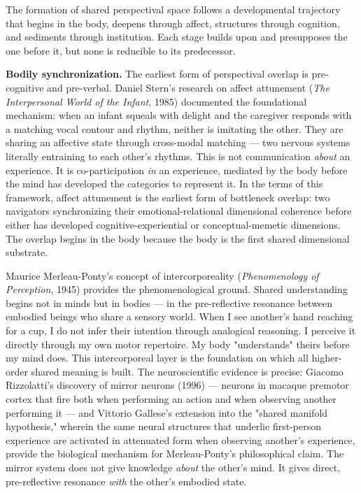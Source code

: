 The formation of shared perspectival space follows a developmental trajectory that begins in the body, deepens through affect, structures through cognition, and sediments through institution. Each stage builds upon and presupposes the one before it, but none is reducible to its predecessor.


\textbf{Bodily synchronization.} The earliest form of perspectival overlap is pre-cognitive and pre-verbal. Daniel Stern's research on affect attunement (\textit{The Interpersonal World of the Infant}, 1985) documented the foundational mechanism: when an infant squeals with delight and the caregiver responds with a matching vocal contour and rhythm, neither is imitating the other. They are sharing an affective state through cross-modal matching — two nervous systems literally entraining to each other's rhythms. This is not communication \textit{about} an experience. It is co-participation \textit{in} an experience, mediated by the body before the mind has developed the categories to represent it. In the terms of this framework, affect attunement is the earliest form of bottleneck overlap: two navigators synchronizing their emotional-relational dimensional coherence before either has developed cognitive-experiential or conceptual-memetic dimensions. The overlap begins in the body because the body is the first shared dimensional substrate.


Maurice Merleau-Ponty's concept of intercorporeality (\textit{Phenomenology of Perception}, 1945) provides the phenomenological ground. Shared understanding begins not in minds but in bodies — in the pre-reflective resonance between embodied beings who share a sensory world. When I see another's hand reaching for a cup, I do not infer their intention through analogical reasoning. I perceive it directly through my own motor repertoire. My body "understands" theirs before my mind does. This intercorporeal layer is the foundation on which all higher-order shared meaning is built. The neuroscientific evidence is precise: Giacomo Rizzolatti's discovery of mirror neurons (1996) — neurons in macaque premotor cortex that fire both when performing an action and when observing another performing it — and Vittorio Gallese's extension into the "shared manifold hypothesis," wherein the same neural structures that underlie first-person experience are activated in attenuated form when observing another's experience, provide the biological mechanism for Merleau-Ponty's philosophical claim. The mirror system does not give knowledge \textit{about} the other's mind. It gives direct, pre-reflective resonance \textit{with} the other's embodied state.


